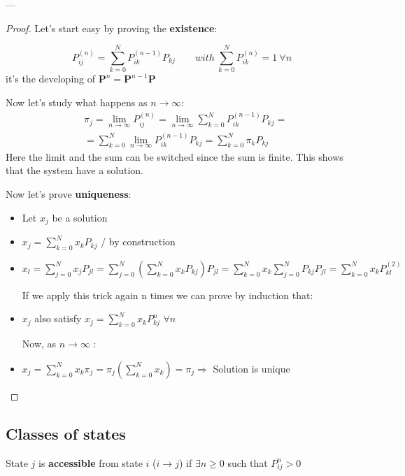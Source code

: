 	---
	\begin{proof} Let's start easy by proving the \textbf{existence}:

		\begin{equation}
  			P_{i j}^{(n)} = \sum_{k=0}^N P_{ik}^{(n-1)} P_{k j}
			\qquad with ~\sum_{k=0}^N P_{ik}^{(n)} = 1 ~\forall n
		\end{equation}
		it's the developing of $\bm P^n = \bm P^{n-1} \bm P$

		Now let's study what happens as $ n \to \infty $:
		\begin{equation}
			\begin{split}
				&\pi_j = \lim_{n \to \infty} P_{ij}^{(n)} = \lim_{n \to \infty} \sum_{k=0}^N P_{ik}^{(n-1)} P_{k j
				} =\\
				&= \sum_{k=0}^N \lim_{n \to \infty} P_{ik}^{(n-1)} P_{k j
				} = \sum_{k=0}^N \pi_k P_{kj}
			\end{split}
		\end{equation}
		Here the limit and the sum can be switched since the sum is finite.
		This shows that the system have a solution.
		
		Now let's prove \textbf{uniqueness}:

		\begin{itemize}
			\item Let $x_j$ be a solution
			\item $x_j = \sum_{k=0}^N x_k P_{kj} $ / by construction
			\item $x_l = \sum_{j=0}^N x_j P_{jl} =  \sum_{j=0}^N ( \sum_{k=0}^N x_k P_{kj} ) P_{jl} =  \sum_{k=0}^N x_k \sum_{j=0}^N P_{kj} 			P_{jl} = \sum_{k=0}^N x_k P_{kl}^{(2)}$

			If we apply this trick again n times we can prove by induction  that:

			\item $x_j$ also satisfy $ x_j = \sum_{k=0}^N x_k P_{kj}^n $ \quad  $\forall n $

			Now, as $n \to \infty$ :

			\item  $x_j = \sum_{k=0}^N x_k \pi_j = \pi_j (\sum_{k=0}^N x_k) = \pi_j  \Rightarrow $ Solution is unique
		\end{itemize}
	\end{proof}

\subsection{Classes of states}
	\begin{definition}
		State $j$ is {\bfseries accessible} from state $i$ ($i \rightarrow j$) if $\exists n \geq 0$ such that $P_{ij}^n > 0$
	\end{definition}

